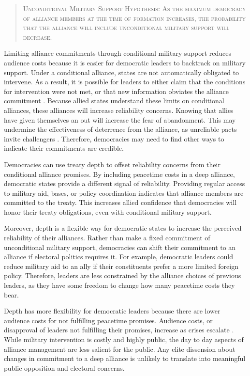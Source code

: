 \documentclass[12pt]{article}
\begin{document}
\begin{quote}
\textsc{Unconditional Military Support Hypothesis: As the maximum democracy of alliance members at the time of formation increases, the probability that the alliance will include unconditional military support will decrease.}
\end{quote} 


Limiting alliance commitments through conditional military support reduces audience costs because it is easier for democratic leaders to backtrack on military support. 
Under a conditional alliance, states are not automatically obligated to intervene. 
As a result, it is possible for leaders to either claim that the conditions for intervention were not met, or that new information obviates the alliance commitment \citep{LevenduskyHorowitz2012}. 
Because allied states understand these limits on conditional alliances, these alliances will increase reliability concerns. 
Knowing that allies have given themselves an out will increase the fear of abandonment. 
This may undermine the effectiveness of deterrence from the alliance, as unreliable pacts invite challengers \citep{Smith1995}. 
Therefore, democracies may need to find other ways to indicate their commitments are credible. 


Democracies can use treaty depth to offset reliability concerns from their conditional alliance promises.  
By including peacetime costs in a deep alliance, democratic states provide a different signal of reliability. 
Providing regular access to military aid, bases, or policy coordination indicates that alliance members are committed to the treaty. 
This increases allied confidence that democracies will honor their treaty obligations, even with conditional military support. 


Moreover, depth is a flexible way for democratic states to increase the perceived reliability of their alliances. 
Rather than make a fixed commitment of unconditional military support, democracies can shift their commitment to an alliance if electoral politics requires it.
For example, democratic leaders could reduce military aid to an ally if their constituents prefer a more limited foreign policy.  
Therefore, leaders are less constrained by the alliance choices of previous leaders, as they have some freedom to change how many peacetime costs they bear. 


Depth has more flexibility for democratic leaders because there are lower audience costs for not fulfilling peacetime promises. 
Audience costs, or disapproval of leaders not fulfilling their promises, increase as crises escalate \citep{Tomz2007}. 
While military intervention is costly and highly public, the day to day aspects of alliance management are less salient for the public. 
Any elite dissension about changes in commitment to a deep alliance is unlikely to translate into meaningful public opposition and electoral concerns. 
\end{document}

